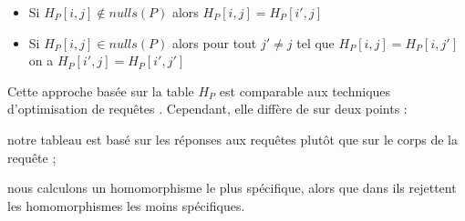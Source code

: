 \begin{itemize}
	\item Si $H_P[i, j] \notin nulls(P)$ alors $H_P[i, j] = H_P[i', j]$
	\item Si $H_P[i, j] \in nulls(P)$ alors pour tout $j' \neq j$ tel que $H_P[i, j] = H_P[i, j']$ on a $H_P[i', j] = H_P[i', j']$
\end{itemize}

\begin{example}

\end{example}

Cette approche basée sur la table $H_P $ est comparable aux techniques d'optimisation de requêtes \cite{}.
Cependant, elle diffère de \cite{ahoEfficientOptimizationClass1979,chandraOptimalImplementationConjunctive1977} sur deux points :
\begin{enumerate*}[label=(\roman*)]
	\item notre tableau est basé sur les réponses aux requêtes plutôt que sur le corps de la requête ;
	\item nous calculons un homomorphisme le plus spécifique, alors que dans \cite{ahoEfficientOptimizationClass1979} ils rejettent les homomorphismes les moins spécifiques.
\end{enumerate*}
